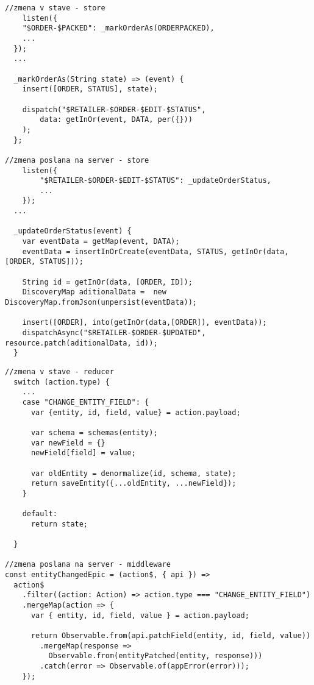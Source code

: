
\begin{lstlisting}[caption=Dotaz na server vo Flux-e v store, label={lst:fetchDart}]
//zmena v stave - store
	listen({
    "$ORDER-$PACKED": _markOrderAs(ORDERPACKED),
    ...
  });
  ...

  _markOrderAs(String state) => (event) {
    insert([ORDER, STATUS], state);

    dispatch("$RETAILER-$ORDER-$EDIT-$STATUS",
        data: getInOr(event, DATA, per({}))
    );
  };

//zmena poslana na server - store
	listen({
		"$RETAILER-$ORDER-$EDIT-$STATUS": _updateOrderStatus,
		...
	});
  ...

  _updateOrderStatus(event) {
    var eventData = getMap(event, DATA);
    eventData = insertInOrCreate(eventData, STATUS, getInOr(data, [ORDER, STATUS]));

    String id = getInOr(data, [ORDER, ID]);
    DiscoveryMap aditionalData =  new DiscoveryMap.fromJson(unpersist(eventData));

    insert([ORDER], into(getInOr(data,[ORDER]), eventData));
    dispatchAsync("$RETAILER-$ORDER-$UPDATED", resource.patch(aditionalData, id));
  }
\end{lstlisting}

\begin{lstlisting}[caption=Dotaz na server v Redux-e cez middleware, label={lst:fetchJS}]
//zmena v stave - reducer
  switch (action.type) {
  	...
    case "CHANGE_ENTITY_FIELD": {
      var {entity, id, field, value} = action.payload;

      var schema = schemas(entity);
      var newField = {}
      newField[field] = value;

      var oldEntity = denormalize(id, schema, state);
      return saveEntity({...oldEntity, ...newField});
    }

    default:
      return state;

  }

//zmena poslana na server - middleware
const entityChangedEpic = (action$, { api }) =>
  action$
    .filter((action: Action) => action.type === "CHANGE_ENTITY_FIELD")
    .mergeMap(action => {
      var { entity, id, field, value } = action.payload;

      return Observable.from(api.patchField(entity, id, field, value))
        .mergeMap(response =>
          Observable.from(entityPatched(entity, response)))
        .catch(error => Observable.of(appError(error)));
    });
\end{lstlisting}